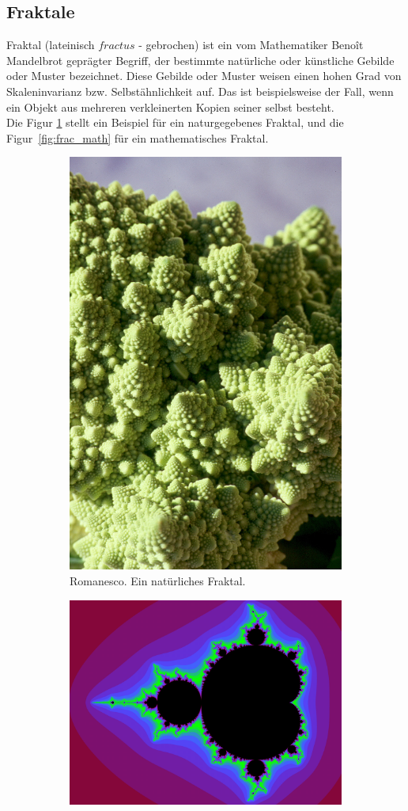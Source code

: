 \documentclass[a4paper,12pt]{llncs}
\makeatletter
\newcommand\nocaption{%
	\renewcommand\p@subfigure{}
	\renewcommand\thesubfigure{\thefigure\alph{subfigure}}
}
\numberwithin{equation}{section}
\makeatother
\begin{document}
\subsection{Fraktale}
Fraktal (lateinisch $fractus$ - gebrochen) ist ein vom Mathematiker Benoît Mandelbrot geprägter Begriff, der bestimmte natürliche oder künstliche Gebilde oder Muster bezeichnet. 
Diese Gebilde oder Muster weisen einen hohen Grad von Skaleninvarianz bzw. Selbstähnlichkeit auf. 
Das ist beispielsweise der Fall, wenn ein Objekt aus mehreren verkleinerten Kopien seiner selbst besteht.~\cite{fraktal} \\
Die Figur \ref{fig:frac_natur} stellt ein Beispiel für ein naturgegebenes Fraktal, und die Figur~\ref{fig:frac_math} für ein mathematisches Fraktal.
\begin{figure}[ht]   
	\nocaption
	\begin{subfigure}{.5\textwidth}
		\centering
		\includegraphics[width=.6\linewidth]{figures/Romanesco}
		\caption{Romanesco. Ein natürliches Fraktal.~\cite{fractal_romanesco}}
		\label{fig:frac_natur}
	\end{subfigure}%
	\begin{subfigure}{.5\textwidth}
		\centering
		\includegraphics[width=.9\linewidth, angle =90 ]{figures/Mandelbrot}

\end{subfigure}
\end{figure}
\end{document}
